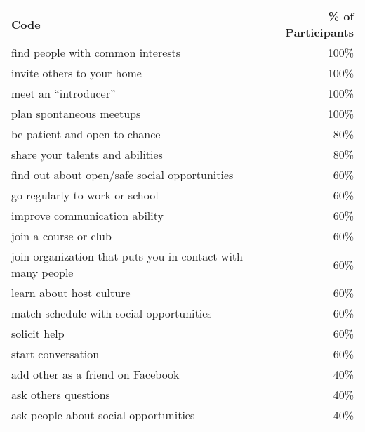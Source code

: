 \begin{longtable}{p{}r}
\textbf{Code}                                               & \textbf{\% of Participants} \\
find people with common interests                           & 100\%                       \\
invite others to your home                                  & 100\%                       \\
meet an ``introducer''                                      & 100\%                       \\
plan spontaneous meetups                                    & 100\%                       \\
be patient and open to chance                               & 80\%                        \\
share your talents and abilities                            & 80\%                        \\
find out about open/safe social opportunities               & 60\%                        \\
go regularly to work or school                              & 60\%                        \\
improve communication ability                               & 60\%                        \\
join a course or club                                       & 60\%                        \\
join organization that puts you in contact with many people & 60\%                        \\
learn about host culture                                    & 60\%                        \\
match schedule with social opportunities                    & 60\%                        \\
solicit help                                                & 60\%                        \\
start conversation                                          & 60\%                        \\
add other as a friend on Facebook                           & 40\%                        \\
ask others questions                                        & 40\%                        \\
ask people about social opportunities                       & 40\%                        \\

\end{longtable}
